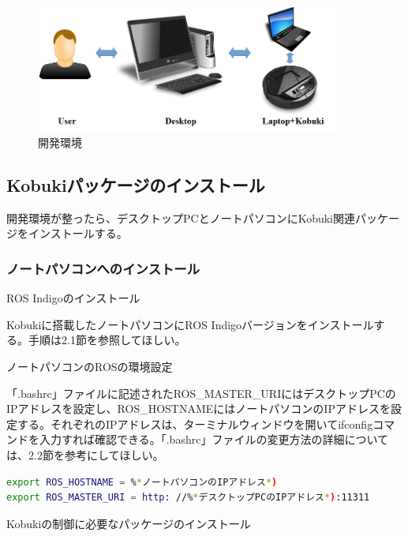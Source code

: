 \begin{itemize}
\begin{figure}[htp]
  \centering
  \includegraphics[width=10cm]{pictures/chapter9/pic_09_11.png}
  \caption{開発環境}
\end{figure}

\subsection{Kobukiパッケージのインストール}

開発環境が整ったら、デスクトップPCとノートパソコンにKobuki関連パッケージをインストールする。

\subsubsection{ノートパソコンへのインストール}

\setcounter{num}{0}

\circled{\thenum} ROS Indigoのインストール

Kobukiに搭載したノートパソコンにROS Indigoバージョンをインストールする。手順は2.1節を参照してほしい。

\circled{\thenum} ノートパソコンのROSの環境設定

「.bashrc」ファイルに記述されたROS\_MASTER\_URIにはデスクトップPCのIPアドレスを設定し、ROS\_HOSTNAMEにはノートパソコンのIPアドレスを設定する。それぞれのIPアドレスは、ターミナルウィンドウを開いてifconfigコマンドを入力すれば確認できる。「.bashrc」ファイルの変更方法の詳細については、2.2節を参考にしてほしい。

\begin{lstlisting}[language=bash]
export ROS_HOSTNAME = %*ノートパソコンのIPアドレス*)
export ROS_MASTER_URI = http: //%*デスクトップPCのIPアドレス*):11311
\end{lstlisting}

\circled{\thenum} Kobukiの制御に必要なパッケージのインストール


\end{itemize}
